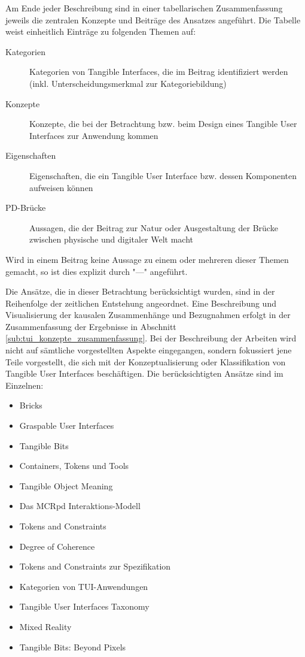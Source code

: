 Am Ende jeder Beschreibung sind in einer tabellarischen Zusammenfassung jeweils die zentralen Konzepte und Beiträge des Ansatzes angeführt. Die Tabelle weist einheitlich Einträge zu folgenden Themen auf:
\begin{description}
 \item[Kategorien] Kategorien von Tangible Interfaces, die im Beitrag identifiziert werden  (inkl. Unterscheidungsmerkmal zur Kategoriebildung)
 \item[Konzepte] Konzepte, die bei der Betrachtung bzw. beim Design eines Tangible User Interfaces zur Anwendung kommen 
 \item[Eigenschaften] Eigenschaften, die ein Tangible User Interface bzw. dessen Komponenten aufweisen können
 \item[PD-Brücke] Aussagen, die der Beitrag zur Natur oder Ausgestaltung der Brücke zwischen physische und digitaler Welt macht
\end{description}

Wird in einem Beitrag keine Aussage zu einem oder mehreren dieser Themen gemacht, so ist dies explizit durch "---" angeführt.

Die Ansätze, die in dieser Betrachtung berücksichtigt wurden, sind in der Reihenfolge der zeitlichen Entstehung angeordnet. Eine Beschreibung und Visualisierung der kausalen Zusammenhänge und Bezugnahmen erfolgt in der Zusammenfassung der Ergebnisse in Abschnitt \ref{sub:tui_konzepte_zusammenfassung}. Bei der Beschreibung der Arbeiten wird nicht auf sämtliche vorgestellten Aspekte eingegangen, sondern fokussiert jene Teile vorgestellt, die sich mit der Konzeptualisierung oder Klassifikation von Tangible User Interfaces beschäftigen. Die berücksichtigten Ansätze sind im Einzelnen:

    \begin{itemize}
    	\item Bricks \citep{Fitzmaurice95}
    	\item Graspable User Interfaces \citep{Fitzmaurice96}
    	\item Tangible Bits \citep{Ishii97}
    	\item Containers, Tokens und Tools \citep{Holmquist99}
		\item Tangible Object Meaning \citep{Underkoffler99}
    	\item Das MCRpd Interaktions-Modell \citep{Ullmer00}
    	\item Tokens and Constraints \citep{Ullmer02}
    	\item Degree of Coherence \citep{Koleva03}
    	\item Tokens and Constraints zur Spezifikation \citep{Shaer04}
    	\item Kategorien von \gls{TUI}-Anwendungen \citep{Klemmer04}
    	\item Tangible User Interfaces Taxonomy \citep{Fishkin04}
    	\item Mixed Reality \citep{Coutrix06}
    	\item Tangible Bits: Beyond Pixels \citep{Ishii08}
    \end{itemize}


